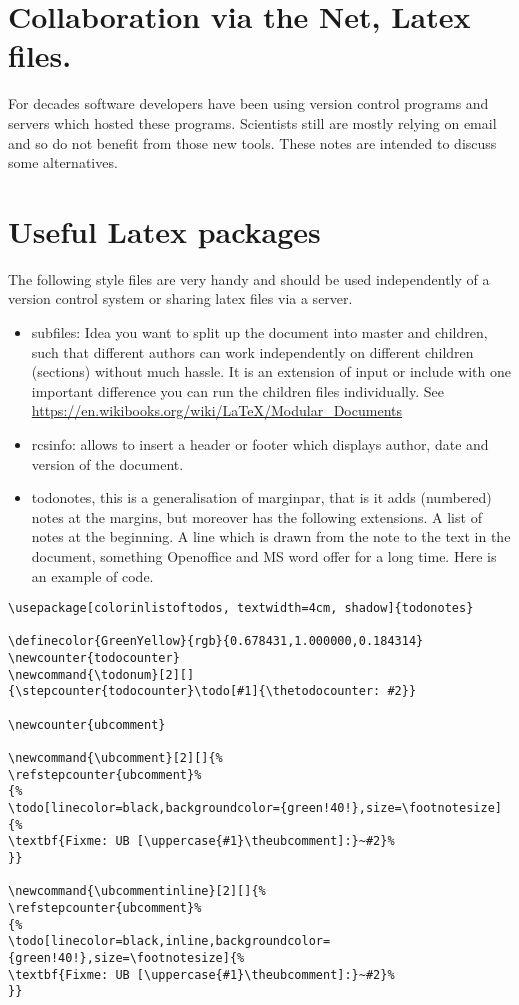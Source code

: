 \documentclass[11pt]{article}
\author{Uwe Brauer}
\date{\today}
\title{}
\begin{document}
\tableofcontents

\section{Collaboration via the Net, Latex files.}
\label{sec:orgheadline1}

For decades software developers have been using version control
programs and servers which hosted these programs. Scientists still are
mostly relying on email and so do not benefit from those new tools.
These notes are intended to discuss some alternatives.

\section{Useful Latex packages}
\label{sec:orgheadline2}


The following style files  are very handy and should be used
independently of a version control system or sharing latex files via a
server. 


\begin{itemize}
\item subfiles: Idea you want to split up the document into master
and children, such that different authors can work
independently on different children (sections) without much
hassle. It is an extension of input or include with one
important difference you can run the children files
individually. See  \url{https://en.wikibooks.org/wiki/LaTeX/Modular_Documents}

\item rcsinfo: allows to insert a header or footer which displays
author, date and version of the document.

\item todonotes, this is a generalisation of marginpar, that is it
adds (numbered) notes at the margins, but moreover has  the
following extensions. A list of notes at the beginning. A line
which is drawn from the note to the text in the document,
something Openoffice and MS word offer for a long time. Here is
an example of code.
\end{itemize}

\begin{verbatim}
\usepackage[colorinlistoftodos, textwidth=4cm, shadow]{todonotes}

\definecolor{GreenYellow}{rgb}{0.678431,1.000000,0.184314}
\newcounter{todocounter}
\newcommand{\todonum}[2][]
{\stepcounter{todocounter}\todo[#1]{\thetodocounter: #2}}

\newcounter{ubcomment}

\newcommand{\ubcomment}[2][]{%
\refstepcounter{ubcomment}%
{%
\todo[linecolor=black,backgroundcolor={green!40!},size=\footnotesize]{%
\textbf{Fixme: UB [\uppercase{#1}\theubcomment]:}~#2}%
}}

\newcommand{\ubcommentinline}[2][]{%
\refstepcounter{ubcomment}%
{%
\todo[linecolor=black,inline,backgroundcolor={green!40!},size=\footnotesize]{%
\textbf{Fixme: UB [\uppercase{#1}\theubcomment]:}~#2}%
}}
\end{verbatim}
\end{document}
